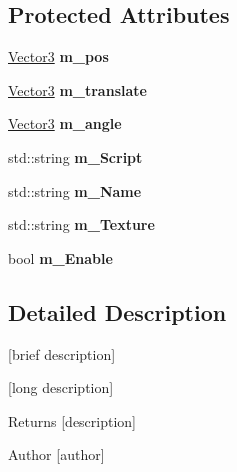 \subsection*{Protected Attributes}
\begin{DoxyCompactItemize}
\item 
\hypertarget{class_game_object_afd5103849de5f37ca335db6f3130ee82}{\hyperlink{struct_vector3}{Vector3} {\bfseries m\-\_\-pos}}\label{class_game_object_afd5103849de5f37ca335db6f3130ee82}

\item 
\hypertarget{class_game_object_a23ef635ddc2f31cb7598603bebe40606}{\hyperlink{struct_vector3}{Vector3} {\bfseries m\-\_\-translate}}\label{class_game_object_a23ef635ddc2f31cb7598603bebe40606}

\item 
\hypertarget{class_game_object_a6c819c0580be60c85aea1461b2b53d78}{\hyperlink{struct_vector3}{Vector3} {\bfseries m\-\_\-angle}}\label{class_game_object_a6c819c0580be60c85aea1461b2b53d78}

\item 
\hypertarget{class_game_object_a99c54e4fc64ef1fbdb94265073cb4922}{std\-::string {\bfseries m\-\_\-\-Script}}\label{class_game_object_a99c54e4fc64ef1fbdb94265073cb4922}

\item 
\hypertarget{class_game_object_afa7a039775a78a0ba3c0a4f03a1d12b9}{std\-::string {\bfseries m\-\_\-\-Name}}\label{class_game_object_afa7a039775a78a0ba3c0a4f03a1d12b9}

\item 
\hypertarget{class_game_object_a3d6c8380de814ab1c847cd7137fa1967}{std\-::string {\bfseries m\-\_\-\-Texture}}\label{class_game_object_a3d6c8380de814ab1c847cd7137fa1967}

\item 
\hypertarget{class_game_object_a45eabe6a1c3d55f65efeddf57c60e2c0}{bool {\bfseries m\-\_\-\-Enable}}\label{class_game_object_a45eabe6a1c3d55f65efeddf57c60e2c0}

\end{DoxyCompactItemize}


\subsection{Detailed Description}
\mbox{[}brief description\mbox{]} 

\mbox{[}long description\mbox{]} \begin{DoxyReturn}{Returns}
\mbox{[}description\mbox{]} 
\end{DoxyReturn}
\begin{DoxyAuthor}{Author}
\mbox{[}author\mbox{]} 
\end{DoxyAuthor}


